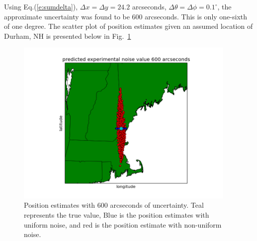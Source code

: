 \documentclass[12pt,a4paper]{book}
\begin{document}
Using Eq.(\ref{e:sumdelta}), $\Delta x = \Delta y = 24.2$ arcseconds, $\Delta \theta = \Delta \phi = 0.1^{\circ}$, the approximate uncertainty was found to be 600 arcseconds. This is only one-sixth of one degree. The scatter plot of position estimates given an assumed location of Durham, NH is presented below in Fig.~\ref{f:map2222}
\begin{figure}[!h]
\centering
\includegraphics[height=8cm]{map2222.png}
\caption{Position estimates with 600 arcseconds of uncertainty. Teal represents the true value, Blue is the position estimates with uniform noise, and red is the position estimate with non-uniform noise.}
\label{f:map2222}
\end{figure}

\end{document}

